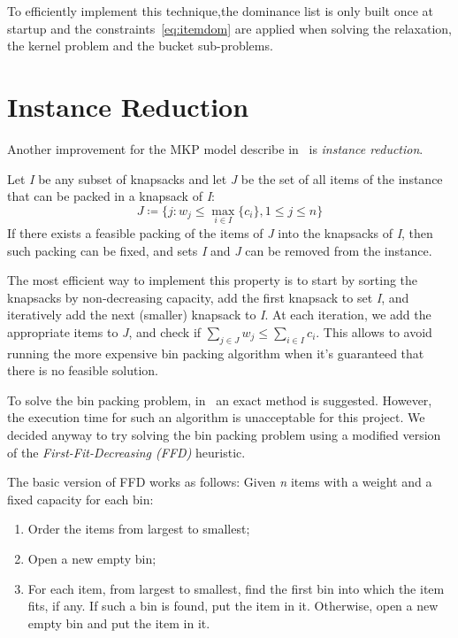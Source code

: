 To efficiently implement this technique,the dominance list is only built once at startup
and the constraints~\eqref{eq:itemdom} are applied when solving
the relaxation, the kernel problem and the bucket sub-problems.


\section{Instance Reduction}
Another improvement for the MKP model describe in~\cite{mkp:2019} is
\textit{instance reduction}.

Let \textit{I} be any subset of knapsacks and let \textit{J} be the set of
all items of the instance that can be packed in a knapsack of \textit{I}:
\begin{equation}
    J \coloneqq \{j:w_{j} \leq \max_{i \in I} \{c_{i}\}, 1 \leq j \leq n\}
\end{equation}
If there exists a feasible packing of the items of \textit{J} into the knapsacks
of \textit{I}, then such packing can be fixed, and sets \textit{I} and \textit{J}
can be removed from the instance.

The most efficient way to implement this property is to start
by sorting the knapsacks by non-decreasing capacity, add the first knapsack
to set \textit{I}, and iteratively add the next (smaller) knapsack to \textit{I}.
At each iteration, we add the appropriate items to \textit{J},
and check if \(\sum_{j \in J} w_{j} \leq \sum_{i \in I} c_{i}\).
This allows to avoid running the more expensive bin packing algorithm
when it's guaranteed that there is no feasible solution.

To solve the bin packing problem, in~\cite{mkp:2019} an exact method is suggested.
However, the execution time for such an algorithm is unacceptable for this project.
We decided anyway to try solving the bin packing problem using a modified
version of the \textit{First-Fit-Decreasing (FFD)} heuristic.

The basic version of FFD works as follows:
Given \textit{n} items with a weight and a fixed capacity for each bin:
\begin{enumerate}
    \item Order the items from largest to smallest;
    \item Open a new empty bin;
    \item For each item, from largest to smallest, find the first bin into which the item fits, if any.
    If such a bin is found, put the item in it.
    Otherwise, open a new empty bin and put the item in it.
\end{enumerate}

